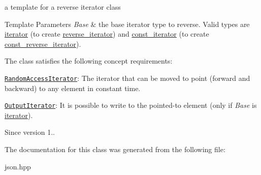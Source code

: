 a template for a reverse iterator class 


\begin{DoxyTemplParams}{Template Parameters}
{\em Base} & the base iterator type to reverse. Valid types are \hyperlink{a00079}{iterator} (to create \hyperlink{a00025_a2f1f83aa187a56dc5ec7a7027065ac8a}{reverse\+\_\+iterator}) and \hyperlink{a00038}{const\+\_\+iterator} (to create \hyperlink{a00025_ae336fff01f4b78e3e16e5008dc8dbc00}{const\+\_\+reverse\+\_\+iterator}).\\
\hline
\end{DoxyTemplParams}
The class satisfies the following concept requirements\+:
\begin{DoxyItemize}
\item \href{http://en.cppreference.com/w/cpp/concept/RandomAccessIterator}{\tt Random\+Access\+Iterator}\+: The iterator that can be moved to point (forward and backward) to any element in constant time.
\item \href{http://en.cppreference.com/w/cpp/concept/OutputIterator}{\tt Output\+Iterator}\+: It is possible to write to the pointed-\/to element (only if {\itshape Base} is \hyperlink{a00079}{iterator}).
\end{DoxyItemize}

\begin{DoxySince}{Since}
version 1.. 
\end{DoxySince}


The documentation for this class was generated from the following file\+:\begin{DoxyCompactItemize}
\item 
json.\+hpp\end{DoxyCompactItemize}
